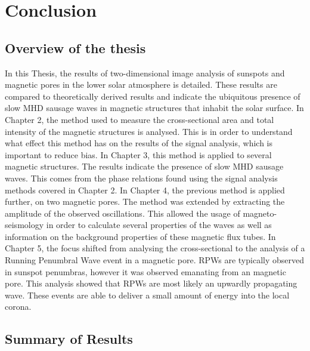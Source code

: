 \graphicspath{{Chapter6/Figs/}}

\chapter{Conclusion}
\label{chapter6}
    
    \vspace*{\fill}\par
    \pagebreak

\section{Overview of the thesis}
    
	In this Thesis, the results of two-dimensional image analysis of sunspots and magnetic pores in the lower solar atmosphere is detailed.
    These results are compared to theoretically derived results and indicate the ubiquitous presence of slow MHD sausage waves in magnetic structures that inhabit the solar surface.
    In Chapter 2, the method used to measure the cross-sectional area and total intensity of the magnetic structures is analysed.
    This is in order to understand what effect this method has on the results of the signal analysis, which is important to reduce bias.
    In Chapter 3, this method is applied to several magnetic structures.
    The results indicate the presence of slow MHD sausage waves.
    This comes from the phase relations found using the signal analysis methods covered in Chapter 2.
    In Chapter 4, the previous method is applied further, on two magnetic pores.
    The method was extended by extracting the amplitude of the observed oscillations.
    This allowed the usage of magneto-seismology in order to calculate several properties of the waves as well as information on the background properties of these magnetic flux tubes.
    In Chapter 5, the focus shifted from analysing the cross-sectional to the analysis of a Running Penumbral Wave event in a magnetic pore.
    RPWs are typically observed in sunspot penumbras, however it was observed emanating from an magnetic pore.
    This analysis showed that RPWs are most likely an upwardly propagating wave.
    These events are able to deliver a small amount of energy into the local corona.
       
\section{Summary of Results}
    
